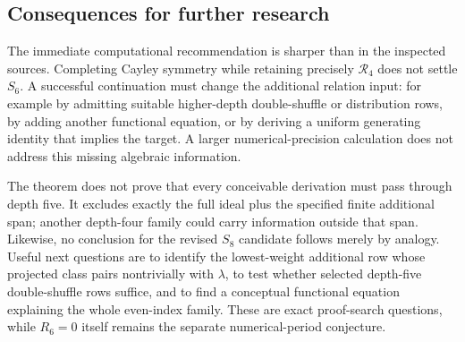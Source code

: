 \subsection{Consequences for further research}

The immediate computational recommendation is sharper than in the
inspected sources. Completing Cayley symmetry while retaining precisely
$\mathscr R_4$ does not settle $S_6$. A successful continuation must change
the additional relation input: for example by admitting suitable
higher-depth double-shuffle or distribution rows, by adding another
functional equation, or by deriving a uniform generating identity that
implies the target. A larger numerical-precision calculation does not
address this missing algebraic information.

The theorem does not prove that every conceivable derivation must pass
through depth five. It excludes exactly the full ideal plus the specified
finite additional span; another depth-four family could carry information
outside that span. Likewise, no conclusion for the revised $S_8$ candidate
follows merely by analogy. Useful next questions are to identify the
lowest-weight additional row whose projected class pairs nontrivially
with $\lambda$, to test whether selected depth-five double-shuffle rows
suffice, and to find a conceptual functional equation explaining the
whole even-index family. These are exact proof-search questions, while
$R_6=0$ itself remains the separate numerical-period conjecture.
